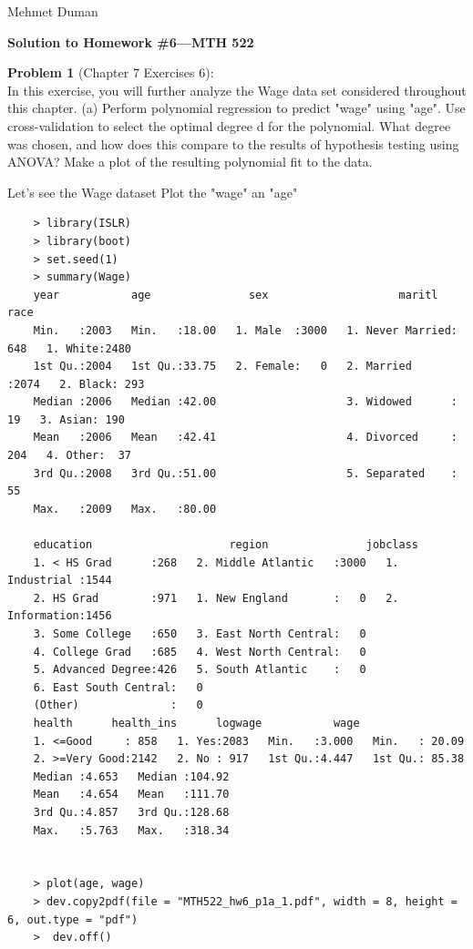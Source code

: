 \documentclass{article}
\begin{document}
\begin{flushright}
	Mehmet Duman
\end{flushright}

\begin{center}
{\Large {\bf Solution to Homework \#6---MTH 522} }
\end{center}

{\bf Problem 1} (Chapter 7 Exercises 6):\\
In this exercise, you will further analyze the Wage data set considered throughout this chapter.
(a) Perform polynomial regression to predict "wage" using "age". Use cross-validation to select the optimal degree d for the polynomial. What degree was chosen, and how does this compare to the results of hypothesis testing using ANOVA? Make a plot of the resulting polynomial fit to the data.

Let's see the Wage dataset
Plot the "wage" an "age"

\begin{program}
	\begin{verbatim}
	> library(ISLR)
	> library(boot)
	> set.seed(1)
	> summary(Wage)
	year           age               sex                    maritl           race     
	Min.   :2003   Min.   :18.00   1. Male  :3000   1. Never Married: 648   1. White:2480  
	1st Qu.:2004   1st Qu.:33.75   2. Female:   0   2. Married      :2074   2. Black: 293  
	Median :2006   Median :42.00                    3. Widowed      :  19   3. Asian: 190  
	Mean   :2006   Mean   :42.41                    4. Divorced     : 204   4. Other:  37  
	3rd Qu.:2008   3rd Qu.:51.00                    5. Separated    :  55                  
	Max.   :2009   Max.   :80.00                                                           
	
	education                     region               jobclass   
	1. < HS Grad      :268   2. Middle Atlantic   :3000   1. Industrial :1544  
	2. HS Grad        :971   1. New England       :   0   2. Information:1456  
	3. Some College   :650   3. East North Central:   0                        
	4. College Grad   :685   4. West North Central:   0                        
	5. Advanced Degree:426   5. South Atlantic    :   0                        
	6. East South Central:   0                        
	(Other)              :   0                        
	health      health_ins      logwage           wage       
	1. <=Good     : 858   1. Yes:2083   Min.   :3.000   Min.   : 20.09  
	2. >=Very Good:2142   2. No : 917   1st Qu.:4.447   1st Qu.: 85.38  
	Median :4.653   Median :104.92  
	Mean   :4.654   Mean   :111.70  
	3rd Qu.:4.857   3rd Qu.:128.68  
	Max.   :5.763   Max.   :318.34  
	
	
	> plot(age, wage)
	> dev.copy2pdf(file = "MTH522_hw6_p1a_1.pdf", width = 8, height = 6, out.type = "pdf")  
	>  dev.off()
	\end{verbatim}
\end{program}
\end{document}
